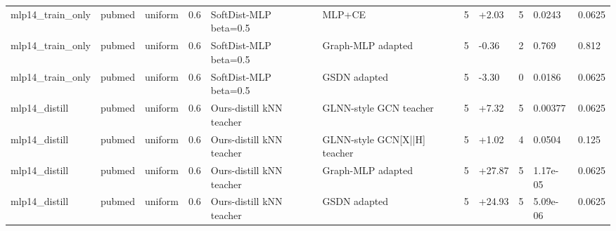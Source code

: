 \begin{table}[t]
\begin{tabular}{llllllrlrll}
mlp14_train_only & pubmed & uniform & 0.6 & SoftDist-MLP beta=0.5 & MLP+CE & 5 & +2.03 & 5 & 0.0243 & 0.0625 \\
mlp14_train_only & pubmed & uniform & 0.6 & SoftDist-MLP beta=0.5 & Graph-MLP adapted & 5 & -0.36 & 2 & 0.769 & 0.812 \\
mlp14_train_only & pubmed & uniform & 0.6 & SoftDist-MLP beta=0.5 & GSDN adapted & 5 & -3.30 & 0 & 0.0186 & 0.0625 \\
mlp14_distill & pubmed & uniform & 0.6 & Ours-distill kNN teacher & GLNN-style GCN teacher & 5 & +7.32 & 5 & 0.00377 & 0.0625 \\
mlp14_distill & pubmed & uniform & 0.6 & Ours-distill kNN teacher & GLNN-style GCN[X||H] teacher & 5 & +1.02 & 4 & 0.0504 & 0.125 \\
mlp14_distill & pubmed & uniform & 0.6 & Ours-distill kNN teacher & Graph-MLP adapted & 5 & +27.87 & 5 & 1.17e-05 & 0.0625 \\
mlp14_distill & pubmed & uniform & 0.6 & Ours-distill kNN teacher & GSDN adapted & 5 & +24.93 & 5 & 5.09e-06 & 0.0625 \\
\bottomrule
\end{tabular}
\end{table}
